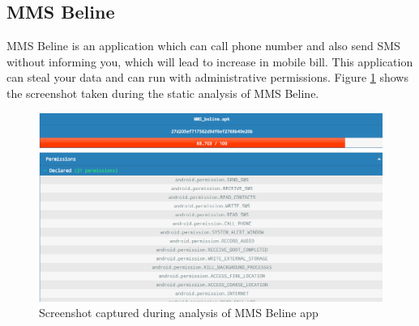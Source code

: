 \subsection{MMS Beline}
MMS Beline is an application which can call phone number  and also send SMS without informing you, which will lead to increase in mobile bill. This application can steal your data and can run with administrative permissions. Figure \ref{fig:mms} shows the screenshot taken during the static analysis of MMS Beline.
\begin{figure}[!h]
  \centering
  \includegraphics [scale=0.5] {mms.png}
  \caption{Screenshot captured during analysis of MMS Beline app}
  \label{fig:mms}
\end{figure}
